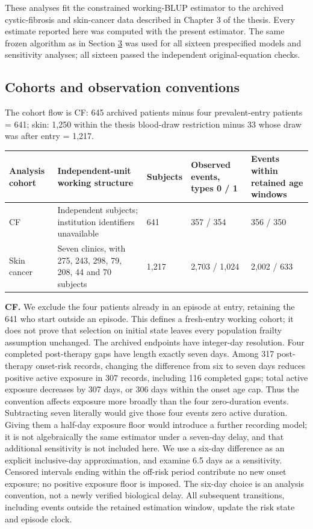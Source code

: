 \documentclass[11pt]{article}
\begin{document}
These analyses fit the constrained working-BLUP estimator to the archived cystic-fibrosis and skin-cancer data described in Chapter 3 of the thesis. Every estimate reported here was computed with the present estimator. The same frozen algorithm as in Section \hyperref[sec:3]{3} was used for all sixteen prespecified models and sensitivity analyses; all sixteen passed the independent original-equation checks.

\subsection{Cohorts and observation conventions}\label{sec:7.1}

The cohort flow is CF: 645 archived patients minus four prevalent-entry patients = 641; skin: 1,250 within the thesis blood-draw restriction minus 33 whose draw was after entry = 1,217.

{\footnotesize\setlength{\tabcolsep}{4pt}
\begin{longtable}{P{44pt}P{161pt}lP{81pt}P{99pt}}
\toprule
\textbf{Analysis cohort} & \textbf{Independent-unit working structure} & \textbf{Subjects} & \textbf{Observed events, types 0 / 1} & \textbf{Events within retained age windows} \\
\midrule
\endhead
\bottomrule
\endlastfoot
CF & Independent subjects; institution identifiers unavailable & 641 & 357 / 354 & 356 / 350 \\
Skin cancer & Seven clinics, with 275, 243, 298, 79, 208, 44 and 70 subjects & 1,217 & 2,703 / 1,024 & 2,002 / 633 \\
\end{longtable}}

\textbf{CF.} We exclude the four patients already in an episode at entry, retaining the 641 who start outside an episode. This defines a fresh-entry working cohort; it does not prove that selection on initial state leaves every population frailty assumption unchanged. The archived endpoints have integer-day resolution. Four completed post-therapy gaps have length exactly seven days. Among 317 post-therapy onset-risk records, changing the difference from six to seven days reduces positive active exposure in 307 records, including 116 completed gaps; total active exposure decreases by 307 days, or 306 days within the onset age cap. Thus the convention affects exposure more broadly than the four zero-duration events. Subtracting seven literally would give those four events zero active duration. Giving them a half-day exposure floor would introduce a further recording model; it is not algebraically the same estimator under a seven-day delay, and that additional sensitivity is not included here. We use a six-day difference as an explicit inclusive-day approximation, and examine 6.5 days as a sensitivity. Censored intervals ending within the off-risk period contribute no new onset exposure; no positive exposure floor is imposed. The six-day choice is an analysis convention, not a newly verified biological delay. All subsequent transitions, including events outside the retained estimation window, update the risk state and episode clock.
\end{document}
